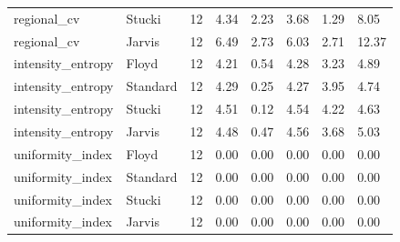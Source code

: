 \begin{tabular}{llrlllll}
regional_cv & Stucki & 12 & 4.34 & 2.23 & 3.68 & 1.29 & 8.05 \\
regional_cv & Jarvis & 12 & 6.49 & 2.73 & 6.03 & 2.71 & 12.37 \\
intensity_entropy & Floyd & 12 & 4.21 & 0.54 & 4.28 & 3.23 & 4.89 \\
intensity_entropy & Standard & 12 & 4.29 & 0.25 & 4.27 & 3.95 & 4.74 \\
intensity_entropy & Stucki & 12 & 4.51 & 0.12 & 4.54 & 4.22 & 4.63 \\
intensity_entropy & Jarvis & 12 & 4.48 & 0.47 & 4.56 & 3.68 & 5.03 \\
uniformity_index & Floyd & 12 & 0.00 & 0.00 & 0.00 & 0.00 & 0.00 \\
uniformity_index & Standard & 12 & 0.00 & 0.00 & 0.00 & 0.00 & 0.00 \\
uniformity_index & Stucki & 12 & 0.00 & 0.00 & 0.00 & 0.00 & 0.00 \\
uniformity_index & Jarvis & 12 & 0.00 & 0.00 & 0.00 & 0.00 & 0.00 \\
\bottomrule
\end{tabular}
